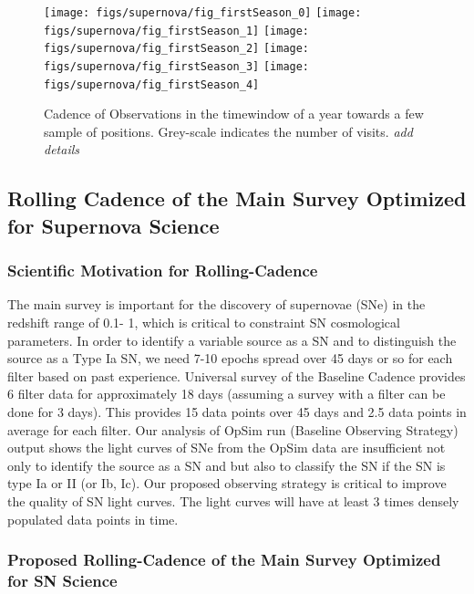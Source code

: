 \begin{figure}[!hb]
    \begin{minipage}[b]{\linewidth}
        \texttt{[image: figs/supernova/fig\_firstSeason\_0]}
        \texttt{[image: figs/supernova/fig\_firstSeason\_1]}
        \texttt{[image: figs/supernova/fig\_firstSeason\_2]}
        \texttt{[image: figs/supernova/fig\_firstSeason\_3]}
        \texttt{[image: figs/supernova/fig\_firstSeason\_4]}
    \end{minipage}
\label{fig:opsimSummary}
\caption{Cadence of Observations in the timewindow of a year towards a few sample of 
positions. Grey-scale indicates the number of visits. {\it add details} 
}
\end{figure}


\subsection{Rolling Cadence of the Main Survey Optimized for Supernova Science}
\subsubsection{ Scientific Motivation for Rolling-Cadence}

The main survey is important for the discovery of supernovae (SNe) in the redshift range of
0.1- 1, which is critical to constraint SN cosmological parameters. In order to identify a
variable source as a SN and to distinguish the source as a Type Ia SN, we need 7-10 epochs
spread over 45 days or so for each filter based on past experience. Universal survey of
the Baseline Cadence provides 6 filter data for approximately 18 days (assuming a survey with
a filter can be done for 3 days). This provides 15 data points over 45 days and 2.5 data
points in average for each filter. Our analysis of OpSim run (Baseline Observing Strategy)
output shows the light curves of SNe from the OpSim data are insufficient not only to
identify the source as a SN and but also to classify the SN if the SN is type Ia or II (or
Ib, Ic). Our proposed observing strategy is critical to improve the quality of SN light
curves. The light curves will have at least 3 times densely populated data points in time. 

\subsubsection{Proposed Rolling-Cadence of the Main Survey Optimized for SN Science }


